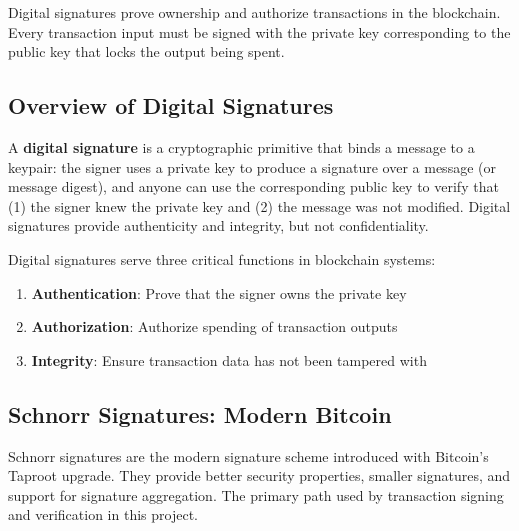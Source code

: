 Digital signatures prove ownership and authorize transactions in the blockchain. Every transaction input must be signed with the private key corresponding to the public key that locks the output being spent.

\subsection{Overview of Digital Signatures}
\label{sec:ch08-sig-overview}

A \textbf{digital signature} is a cryptographic primitive that binds a message to a keypair: the signer uses a private key to produce a signature over a message (or message digest), and anyone can use the corresponding public key to verify that (1) the signer knew the private key and (2) the message was not modified. Digital signatures provide authenticity and integrity, but not confidentiality.

Digital signatures serve three critical functions in blockchain systems:

\begin{enumerate}
  \item \textbf{Authentication}: Prove that the signer owns the private key
  \item \textbf{Authorization}: Authorize spending of transaction outputs
  \item \textbf{Integrity}: Ensure transaction data has not been tampered with
\end{enumerate}

\subsection{Schnorr Signatures: Modern Bitcoin}
\label{sec:ch08-schnorr}

Schnorr signatures are the modern signature scheme introduced with Bitcoin's Taproot upgrade. They provide better security properties, smaller signatures, and support for signature aggregation. The primary path used by transaction signing and verification in this project.

